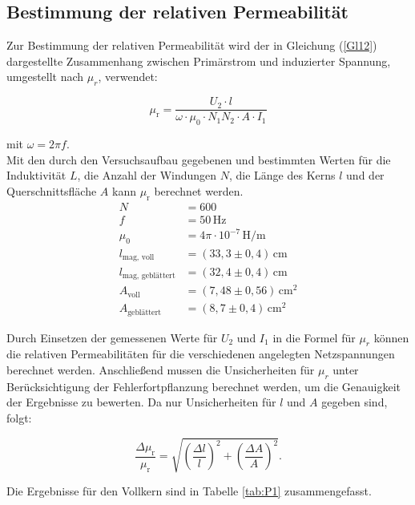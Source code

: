 \subsection{Bestimmung der relativen Permeabilität}\label{sec:Teil3}
Zur Bestimmung der relativen Permeabilität wird der in Gleichung (\ref{Gl12}) dargestellte Zusammenhang zwischen Primärstrom und induzierter Spannung, umgestellt nach $\mu_r$, verwendet:

\begin{equation}
    \mu_\mathrm{r} = \frac{U_2 \cdot l}{\omega \cdot \mu_0 \cdot N_1 N_2 \cdot A \cdot I_1}
\end{equation}

\noindent mit $\omega = 2\pi f$. \\
Mit den durch den Versuchsaufbau gegebenen und bestimmten Werten für die Induktivität $L$, die Anzahl der Windungen $N$, die
Länge des Kerns $l$ und der Querschnittsfläche $A$ kann $\mu_\mathrm{r}$ berechnet werden.
\begin{align}
    N &= 600 \\
    f &= 50\,\text{Hz} \\
    \mu_0 &= 4\pi \cdot 10^{-7}\,\text{H/m} \\
    l_{\text{mag, voll}} &= (33{,}3 \pm 0{,}4)\,\text{cm} \\
    l_{\text{mag, geblättert}} &= (32{,}4 \pm 0{,}4)\,\text{cm} \\
    A_{\text{voll}} &= (7{,}48 \pm 0{,}56)\,\text{cm}^2 \\
    A_{\text{geblättert}} &= (8{,}7 \pm 0{,}4)\,\text{cm}^2
\end{align}

\noindent Durch Einsetzen der gemessenen Werte für $U_2$ und $I_1$ in die Formel für $\mu_r$ können die relativen Permeabilitäten für die verschiedenen angelegten Netzspannungen berechnet werden. 
Anschließend mussen die Unsicherheiten für $\mu_r$ unter Berücksichtigung der Fehlerfortpflanzung berechnet werden, um die Genauigkeit der Ergebnisse zu bewerten. Da nur Unsicherheiten für $l$ und $A$ gegeben sind, folgt:

\begin{equation}
    \frac{\Delta \mu_\mathrm{r}}{\mu_\mathrm{r}}
    =
    \sqrt{
        \left(\frac{\Delta l}{l}\right)^2
        +
        \left(\frac{\Delta A}{A}\right)^2
    }.
\end{equation}



\noindent Die Ergebnisse für den Vollkern sind in Tabelle \ref{tab:P1} zusammengefasst.


